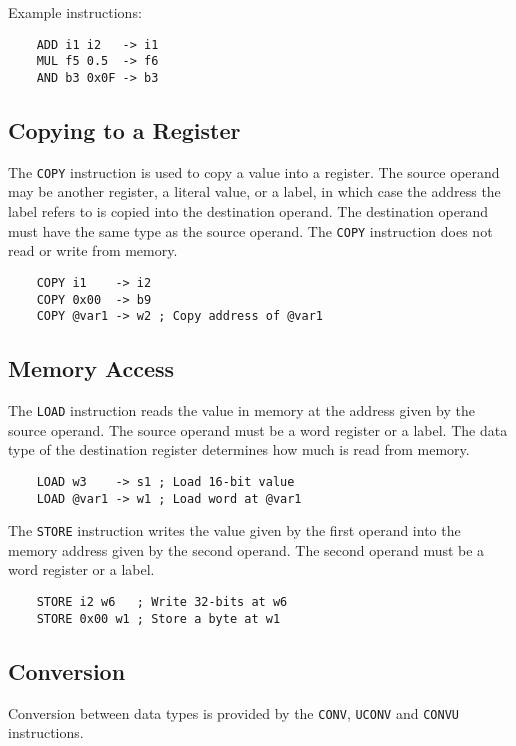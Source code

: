 Example instructions:

\begin{verbatim}
    ADD i1 i2   -> i1
    MUL f5 0.5  -> f6
    AND b3 0x0F -> b3
\end{verbatim}

\subsection{Copying to a Register}

The \texttt{COPY} instruction is used to copy a value into
a register. The source operand may be another register,
a literal value, or a label, in which case the address
the label refers to is copied into the destination operand.
The destination operand must have the same type as the source operand.
The \texttt{COPY} instruction does not read or write from memory.

\begin{verbatim}
    COPY i1    -> i2
    COPY 0x00  -> b9
    COPY @var1 -> w2 ; Copy address of @var1
\end{verbatim}

\subsection{Memory Access}

The \texttt{LOAD} instruction reads the value in memory
at the address given by the source operand. The source operand
must be a word register or a label. The data type of the
destination register determines how much is read from memory.

\begin{verbatim}
    LOAD w3    -> s1 ; Load 16-bit value
    LOAD @var1 -> w1 ; Load word at @var1
\end{verbatim}

The \texttt{STORE} instruction writes the value given by
the first operand into the memory address given by the
second operand. The second operand must be a word register
or a label.

\begin{verbatim}
    STORE i2 w6   ; Write 32-bits at w6
    STORE 0x00 w1 ; Store a byte at w1
\end{verbatim}

\subsection{Conversion}

Conversion between data types is provided by the
\texttt{CONV}, \texttt{UCONV} and \texttt{CONVU} instructions.

